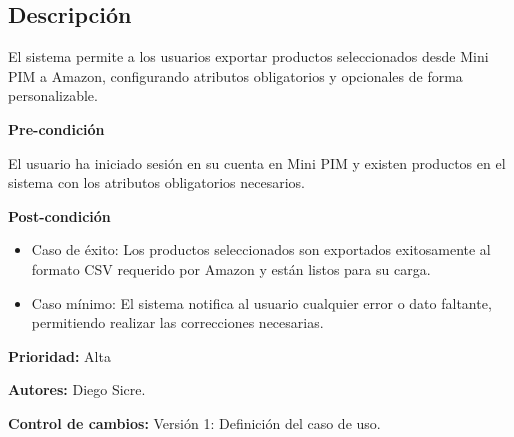 {}

\subsection*{Descripción}
El sistema permite a los usuarios exportar productos seleccionados desde Mini PIM a Amazon, configurando atributos obligatorios y opcionales de forma personalizable.

\vspace{0.15cm}

\textbf{Pre-condición}\par
El usuario ha iniciado sesión en su cuenta en Mini PIM y existen productos en el sistema con los atributos obligatorios necesarios.

\vspace{0.15cm}

\textbf{Post-condición}
\begin{itemize}
    \item Caso de éxito: Los productos seleccionados son exportados exitosamente al formato CSV requerido por Amazon y están listos para su carga.
    \item Caso mínimo: El sistema notifica al usuario cualquier error o dato faltante, permitiendo realizar las correcciones necesarias.
\end{itemize}

\textbf{Prioridad:}
Alta

\vspace{0.15cm}

\textbf{Autores:}
Diego Sicre.

\vspace{0.15cm}

\textbf{Control de cambios: } Versión 1: Definición del caso de uso.


